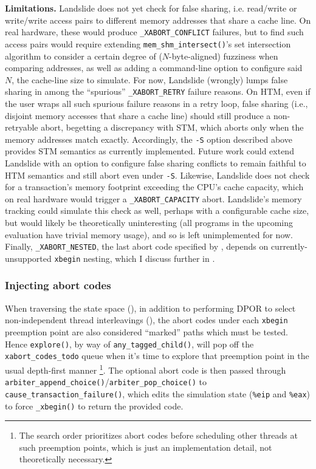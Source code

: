 {\bf Limitations.}
Landslide does not yet check for false sharing,
i.e. read/write or write/\allowbreak{}write access pairs to different memory addresses that share a cache line.
On real hardware, these would produce {\tt \_XABORT\_CONFLICT} failures,
but to find such access pairs would require extending {\tt mem\_shm\_intersect()}'s set intersection algorithm
to consider a certain degree of ($N$-byte-aligned) fuzziness when comparing addresses,
as well as adding a command-line option to configure said $N$, the cache-line size to simulate.
For now, Landslide (wrongly) lumps false sharing in among the ``spurious'' {\tt \_XABORT\_RETRY} failure reasons.
%
On HTM, even if the user wraps all such spurious failure reasons in a retry loop,
false sharing (i.e., disjoint memory accesses that share a cache line)
should still produce a non-retryable abort,
begetting a discrepancy with STM,
which aborts only when the memory addresses match exactly.
Accordingly, the {\tt -S} option described above provides STM semantics as currently implemented.
Future work could extend Landslide with an option to configure false sharing conflicts
to remain faithful to HTM semantics and still abort even under {\tt -S}.
%
Likewise, Landslide does not check for a transaction's memory footprint exceeding the CPU's cache capacity,
which on real hardware would trigger a {\tt \_XABORT\_CAPACITY} abort.
Landslide's memory tracking could simulate this check as well,
perhaps with a configurable cache size,
but would likely be theoretically uninteresting
(all programs in the upcoming evaluation have trivial memory usage),
and so is left unimplemented for now.
%
Finally,
{\tt \_XABORT\_NESTED},
the last abort code specified by \cite{htm-gcc},
depends on currently-unsupported {\tt xbegin} nesting, which I discuss further in
\sect{\ref{sec:tm-warpzone-nested}}.

\subsubsection{Injecting abort codes}
When traversing the state space (\sect{\ref{sec:landslide-statespace}}),
in addition to performing DPOR to select non-independent thread interleavings (\sect{\ref{sec:landslide-dpor}}),
the abort codes under each {\tt xbegin} preemption point are also considered ``marked'' paths which must be tested.
Hence {\tt explore()}, by way of {\tt any\_tagged\_child()},
will pop off the {\tt xabort\_codes\_todo} queue
when it's time to explore that preemption point in the usual depth-first manner%
\footnote{The search order prioritizes abort codes before scheduling other threads
at such preemption points,
which is just an implementation detail, not theoretically necessary.}.
The optional abort code is then passed through {\tt arbiter\_append\_choice()}/{\tt arbiter\_pop\_choice()}
to {\tt cause\_transaction\_failure()},
which edits the simulation state ({\tt \%eip} and {\tt \%eax})
to force {\tt \_xbegin()} to return the provided code.

